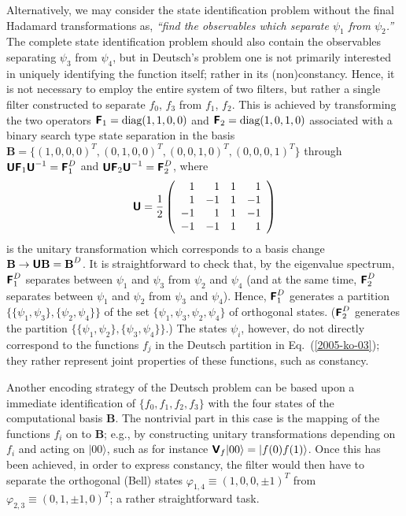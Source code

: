 Alternatively, we may consider the state identification problem without the final Hadamard transformations
as, {\em ``find the observables which separate $\psi_1$ from $\psi_2$.''}
The complete state identification problem should also contain the observables separating $\psi_3$ from $\psi_4$,
but in Deutsch's problem one is not primarily interested
in uniquely identifying the function itself; rather in its (non)constancy.
Hence, it is not necessary to employ the entire system of two filters, but rather
a single filter constructed to separate $f_0$, $f_3$ from  $f_1$, $f_2$.
This is achieved
by transforming the two operators
$\textsf{\textbf{F}}_1 =\textrm{diag}(1,1,0,0)$
and
$\textsf{\textbf{F}}_2 =\textrm{diag}(1,0,1,0)$
associated with a binary search type state separation in the  basis
$\textbf{B}=\{
(1,0,0,0)^T,
(0,1,0,0)^T,
(0,0,1,0)^T,
(0,0,0,1)^T\}$
through
$\textsf{\textbf{U}}\textsf{\textbf{F}}_1\textsf{\textbf{U}}^{-1} =\textsf{\textbf{F}}^D_1$ and
$\textsf{\textbf{U}}\textsf{\textbf{F}}_2\textsf{\textbf{U}}^{-1} =\textsf{\textbf{F}}^D_2$,
where
\begin{equation}
\textsf{\textbf{U}}=\frac{1}{2}
\left(
\begin{array}{rrrr}
 1&  1& 1&  1\\
 1& -1& 1& -1\\
-1&  1& 1& -1\\
-1& -1& 1&  1
\end{array}
\right)
\end{equation}
is the unitary transformation which corresponds to a basis change
$\textbf{B} \rightarrow \textsf{\textbf{U}}\textbf{B}=\textbf{B}^D$.
It is straightforward to check that, by the eigenvalue spectrum,
$\textsf{\textbf{F}}^D_1$ separates between
$\psi_1$ and $\psi_3$ from
$\psi_2$ and $\psi_4$
(and at the same time,
$\textsf{\textbf{F}}^D_2$ separates between
$\psi_1$ and $\psi_2$ from
$\psi_3$ and $\psi_4$).
Hence, $\textsf{\textbf{F}}^D_1$ generates a partition
$\{\{\psi_1,\psi_3\},\{\psi_2,\psi_4\}\}$ of the set
$\{\psi_1,\psi_3,\psi_2,\psi_4\}$
of orthogonal states.
($\textsf{\textbf{F}}^D_2$ generates the partition
$\{\{\psi_1,\psi_2\},\{\psi_3,\psi_4\}\}$.)
The states $\psi_i$, however, do not directly correspond to the functions $f_j$ in the
Deutsch partition in Eq.~(\ref{2005-ko-03}); they rather represent
joint properties of these functions, such as constancy.

Another encoding strategy of the Deutsch problem
can be based upon a immediate identification of
$\{f_0,f_1,f_2,f_3\}$
with the four states of the computational basis $\textbf{B}$.
The nontrivial part in this case is the mapping of the functions $f_i$ on to $\textbf{B}$;
e.g., by constructing unitary transformations depending
on $f_i$ and acting on $\vert 0 0 \rangle$, such
as for instance $\textsf{\textbf{V}}_f\vert 0 0 \rangle=\vert f(0) f(1) \rangle$.
Once this has been achieved,
in order to express constancy, the filter would then have to
separate the orthogonal (Bell) states
$\varphi_{1,4}\equiv (1,0,0,\pm 1)^T$
from
$\varphi_{2,3}\equiv  (0,1,\pm 1,0)^T$;
a rather straightforward task.


